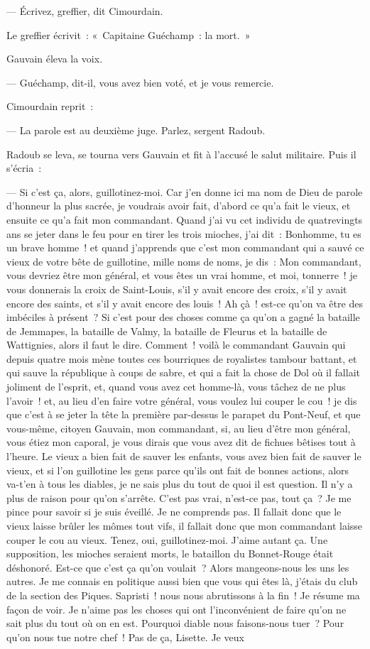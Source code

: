 \documentclass[french,twoside]{book} %
\begin{document}
— Écrivez, greffier, dit Cimourdain.\par
Le greffier écrivit : « Capitaine Guéchamp : la mort. »\par
Gauvain éleva la voix.\par
— Guéchamp, dit-il, vous avez bien voté, et je vous remercie.\par
Cimourdain reprit :\par
— La parole est au deuxième juge. Parlez, sergent Radoub.\par
Radoub se leva, se tourna vers Gauvain et fit à l’accusé le salut militaire. Puis il s’écria :\par
— Si c’est ça, alors, guillotinez-moi. Car j’en donne ici ma nom de Dieu de parole d’honneur la plus sacrée, je voudrais avoir fait, d’abord ce qu’a fait le vieux, et ensuite ce qu’a fait mon commandant. Quand j’ai vu cet individu de quatrevingts ans se jeter dans le feu pour en tirer les trois mioches, j’ai dit : Bonhomme, tu es un brave homme ! et quand j’apprends que c’est mon commandant qui a sauvé ce vieux de votre bête de guillotine, mille noms de noms,  je dis : Mon commandant, vous devriez être mon général, et vous êtes un vrai homme, et moi, tonnerre ! je vous donnerais la croix de Saint-Louis, s’il y avait encore des croix, s’il y avait encore des saints, et s’il y avait encore des louis ! Ah çà ! est-ce qu’on va être des imbéciles à présent ? Si c’est pour des choses comme ça qu’on a gagné la bataille de Jemmapes, la bataille de Valmy, la bataille de Fleurus et la bataille de Wattignies, alors il faut le dire. Comment ! voilà le commandant Gauvain qui depuis quatre mois mène toutes ces bourriques de royalistes tambour battant, et qui sauve la république à coups de sabre, et qui a fait la chose de Dol où il fallait joliment de l’esprit, et, quand vous avez cet homme-là, vous tâchez de ne plus l’avoir ! et, au lieu d’en faire votre général, vous voulez lui couper le cou ! je dis que c’est à se jeter la tête la première par-dessus le parapet du Pont-Neuf, et que vous-même, citoyen Gauvain, mon commandant, si, au lieu d’être mon général, vous étiez mon caporal, je vous dirais que vous avez dit de fichues bêtises tout à l’heure. Le vieux a bien fait de sauver les enfants, vous avez bien fait de sauver le vieux, et si l’on guillotine les gens parce qu’ils ont fait de bonnes actions, alors va-t’en à tous les diables, je ne sais plus du tout de quoi il est question. Il n’y a plus de raison pour qu’on s’arrête. C’est pas vrai, n’est-ce pas, tout ça ? Je me pince pour savoir si je suis éveillé. Je ne comprends pas. Il fallait donc que le vieux laisse brûler les mômes tout vifs, il fallait donc que mon commandant laisse couper le cou au  vieux. Tenez, oui, guillotinez-moi. J’aime autant ça. Une supposition, les mioches seraient morts, le bataillon du Bonnet-Rouge était déshonoré. Est-ce que c’est ça qu’on voulait ? Alors mangeons-nous les uns les autres. Je me connais en politique aussi bien que vous qui êtes là, j’étais du club de la section des Piques. Sapristi ! nous nous abrutissons à la fin ! Je résume ma façon de voir. Je n’aime pas les choses qui ont l’inconvénient de faire qu’on ne sait plus du tout où on en est. Pourquoi diable nous faisons-nous tuer ? Pour qu’on nous tue notre chef ! Pas de ça, Lisette. Je veux 
\end{document}
